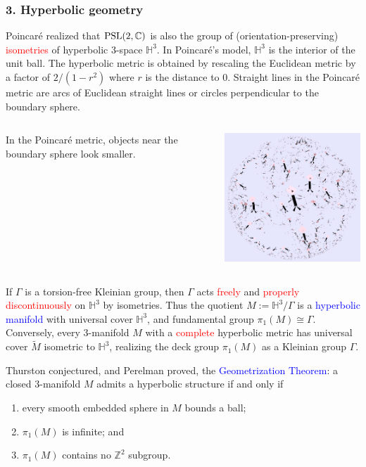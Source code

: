 \documentclass{beamer}
\def\Z{\mathbb{Z}}
\def\H{\mathbb{H}}
\def\C{\mathbb{C}}
\def\PSL{\textnormal{PSL}}
\begin{document}
\frame
{
\frametitle{3. Hyperbolic geometry}
Poincar\'e realized that $\PSL(2,\C)$ is also the group
of (orientation-preserving) \textcolor{red}{isometries} of hyperbolic 3-space $\H^3$.
\vskip 10pt
In Poincar\'e's model, $\H^3$ is the interior of the unit ball.
The hyperbolic metric is obtained by rescaling the Euclidean metric
by a factor of $2/(1-r^2)$ where $r$ is the distance to $0$.
\vskip 10pt
Straight lines in the Poincar\'e metric are arcs of Euclidean
straight lines or circles perpendicular to the boundary sphere.
}
\frame
{
\begin{columns}[c]
\column{1.1in}
In the Poincar\'e
metric, objects near the
boundary sphere look
smaller.
\column{3in}
\begin{center}
\includegraphics[width=3in]{Poincare.png}
\end{center}
\end{columns}
}
\frame
{
If $\Gamma$ is a torsion-free Kleinian group, then
$\Gamma$ acts \textcolor{red}{freely} and \textcolor{red}{properly discontinuously}
on $\H^3$ by isometries.
\vskip 10pt
Thus the quotient $M:=\H^3/\Gamma$ is a \textcolor{blue}{hyperbolic manifold}
with universal cover $\H^3$, and fundamental group $\pi_1(M)\cong \Gamma$.
\vskip 10pt
Conversely, every 3-manifold $M$ with a \textcolor{red}{complete} hyperbolic
metric has universal cover $\widetilde{M}$ isometric to $\H^3$, realizing
the deck group $\pi_1(M)$ as a Kleinian group $\Gamma$.
}
\frame
{
Thurston conjectured, and Perelman proved, the 
\vskip 10pt
\textcolor{blue}{Geometrization Theorem}: a closed 3-manifold $M$ admits a hyperbolic structure if and only if
\begin{enumerate}
\item{every smooth embedded sphere in $M$ bounds a ball;}
\item{$\pi_1(M)$ is infinite; and}
\item{$\pi_1(M)$ contains no $\Z^2$ subgroup.}
\end{enumerate}
}
\end{document}
